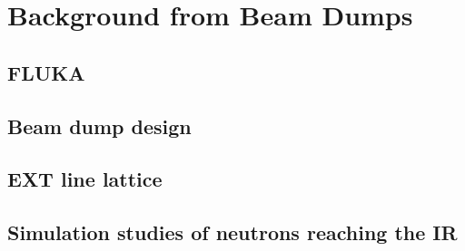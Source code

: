\chapter{Background from Beam Dumps}
\label{BeamDumps}
\section{FLUKA}
\label{BeamDumps:fluka}
\section{Beam dump design}
\label{BeamDumps:design}
\section{EXT line lattice}
\label{BeamDumps:lattice}
\section{Simulation studies of neutrons reaching the IR}
\label{BeamDumps:simulation}
